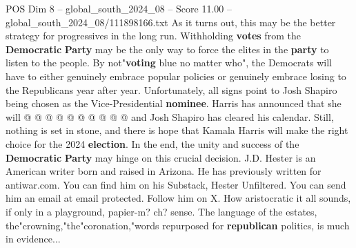\begin{textsample}{POS Dim 8 – global\_south\_2024\_08 – Score 11.00 – global\_south\_2024\_08/111898166.txt}
As it turns out, this may be the better strategy for progressives in the long run.
Withholding \textbf{votes} from the \textbf{Democratic} \textbf{Party} may be the only way to force the elites in the \textbf{party} to listen to the people.
By not"\textbf{voting} blue no matter who", the Democrats will have to either genuinely embrace popular policies or genuinely embrace losing to the Republicans year after year.
Unfortunately, all signs point to Josh Shapiro being chosen as the Vice-Presidential \textbf{nominee}.
Harris has announced that she will @ @ @ @ @ @ @ @ @ @ and Josh Shapiro has cleared his calendar.
Still, nothing is set in stone, and there is hope that Kamala Harris will make the right choice for the 2024 \textbf{election}.
In the end, the unity and success of the \textbf{Democratic} \textbf{Party} may hinge on this crucial decision.
J.D.
Hester is an American writer born and raised in Arizona.
He has previously written for antiwar.com.
You can find him on his Substack, Hester Unfiltered.
You can send him an email at email protected.
Follow him on X.
How aristocratic it all sounds, if only in a playground, papier-m? ch? sense.
The language of the estates, the"crowning,"the"coronation,"words repurposed for \textbf{republican} politics, is much in evidence...

\end{textsample}
